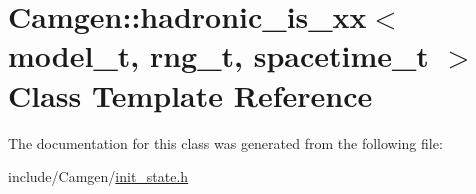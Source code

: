 \hypertarget{a00260}{}\section{Camgen\+:\+:hadronic\+\_\+is\+\_\+xx$<$ model\+\_\+t, rng\+\_\+t, spacetime\+\_\+t $>$ Class Template Reference}
\label{a00260}


The documentation for this class was generated from the following file\+:\begin{DoxyCompactItemize}
\item 
include/\+Camgen/\hyperlink{a00669}{init\+\_\+state.\+h}\end{DoxyCompactItemize}
